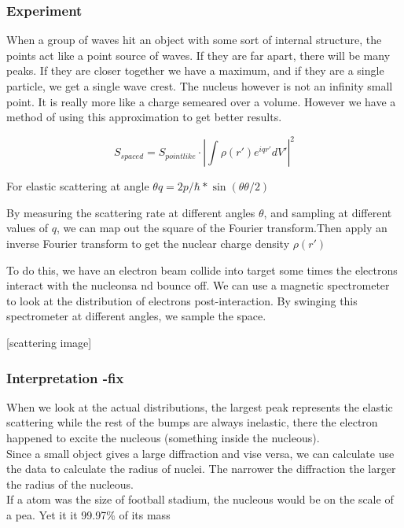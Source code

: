 \documentclass[english, 11pt]{article}
\begin{document}
      \subsubsection{Experiment}

      When a group of waves hit an object with some sort of internal structure, the points act like a point source of waves. If they are far apart, there will be many peaks. If they are closer together we have a maximum, and if they are a single particle, we get a single wave crest. The nucleus however is not an infinity small point. It is really more like a charge semeared over a volume. However we have a method of using this approximation to get better results.

        \[ S_{spaced} = S_{pointlike} \cdot |\int \rho(r') e^{iqr'}dV'| ^2 \]

      For elastic scattering at angle $\theta q = 2p / \hbar * \sin(\theta θ/2)$

      By measuring the scattering rate at different angles $\theta$, and sampling at different values of $q$, we can map out the square of the Fourier transform.Then apply an inverse Fourier transform to get the nuclear charge density $\rho(r')$
      
      To do this, we have an electron beam collide into target some times the electrons interact with the nucleonsa nd bounce off. We can use a magnetic spectrometer to look at the distribution of electrons post-interaction. By swinging this spectrometer at different angles, we sample the space. \\

      \begin{center}
        [scattering image]
      \end{center}

      \subsubsection{Interpretation -fix}

      When we look at the actual distributions, the largest peak represents the elastic scattering while the rest of the bumps are always inelastic, there the electron happened to excite the nucleous (something inside the nucleous).\\
      Since a small object gives a large diffraction and vise versa, we can calculate use the data to calculate the radius of nuclei. The narrower the diffraction the larger the radius of the nucleous.\\
      If a atom was the size of football stadium, the nucleous would be on the scale of a pea. Yet it it 99.97\% of its mass
\end{document}
